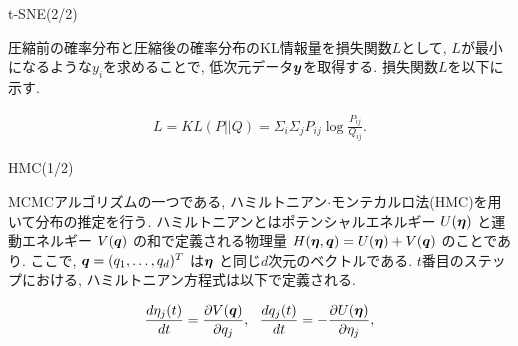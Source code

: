 \documentclass[dvipdfmx]{beamer} %
\newcommand{\bm}[1]{\mbox{\boldmath $#1$}}
\begin{document}
\begin{frame}{t-SNE(2/2)}

圧縮前の確率分布と圧縮後の確率分布のKL情報量を損失関数$L$として, $L$が最小になるような$y_i$を求めることで, 低次元データ$\bm y$を取得する. 損失関数$L$を以下に示す.

\begin{eqnarray*}
\label{tsne3}
L = KL(P || Q) = \Sigma_i \Sigma_j P_{ij} \log \frac{P_{ij}}{Q_{ij}}.
\end{eqnarray*}
\end{frame}

\begin{frame}{HMC(1/2)}

MCMCアルゴリズムの一つである, ハミルトニアン$\cdot$モンテカルロ法(HMC)を用いて分布の推定を行う. ハミルトニアンとはポテンシャルエネルギー $U(\bm \eta)$ と運動エネルギー $V(\bm q)$ の和で定義される物理量 $H(\bm \eta, \bm q) = U(\bm \eta) + V(\bm q)$ のことであり. ここで, $\bm q = (q_1, \dots, q_d)^T$ は$\bm \eta$ と同じ$d$次元のベクトルである. $t$番目のステップにおける, ハミルトニアン方程式は以下で定義される. 

\begin{eqnarray*}
\label{HMC}
\frac{d \eta_j(t)}{dt} = \frac{\partial V(\bm q)}{\partial q_j},\ \ \frac{d q_j(t)}{dt} = - \frac{\partial U(\bm \eta)}{\partial \eta_j},
\end{eqnarray*}
\end{frame}
\end{document}

